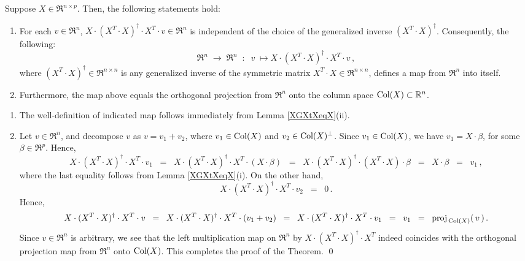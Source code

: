 \begin{theorem}
\mbox{}\vskip 0.1cm\noindent
Suppose $X \in \Re^{n \times p}$.
Then, the following statements hold:
\begin{enumerate}
\item
	For each $v \in \Re^{n}$, $X \cdot (X^{T} \cdot X)^{\dagger} \cdot X^{T} \cdot v \in \Re^{n}$
	is independent of the choice of the generalized inverse $(X^{T} \cdot X)^{\dagger}$.
	Consequently, the following:
	\begin{equation*}
	\Re^{n} \; \longrightarrow \; \Re^{n}
	\;\; : \;\;
	v \; \longmapsto X \cdot (X^{T} \cdot X)^{\dagger} \cdot X^{T} \cdot v\,,
	\end{equation*}
	where $(X^{T} \cdot X)^{\dagger} \in \Re^{n \times n}$
	is any generalized inverse of the symmetric matrix
	$X^{T} \cdot X \in \Re^{n \times n}$, defines a map from $\Re^{n}$ into itself.
\item
	Furthermore, the map above equals the orthogonal projection
	from $\Re^{n}$ onto the column space $\textnormal{Col}(X) \subset \mathbb{R}^{n}$.
\end{enumerate}
\end{theorem}
\proof
\begin{enumerate}
\item
	The well-definition of indicated map follows immediately from Lemma \ref{XGXtXeqX}(ii).
\item
Let $v \in \Re^{n}$, and decompose $v$ as $v = v_{1} + v_{2}$,
where $v_{1} \in \textnormal{Col}(X)$ and $v_{2} \in \textnormal{Col}(X)^{\perp}$.
Since $v_{1} \in \textnormal{Col}(X)$, we have $v_{1} = X\cdot\beta$,
for some $\beta \in \Re^{p}$.
Hence,
\begin{equation*}
X \cdot (X^{T} \cdot X)^{\dagger} \cdot X^{T} \cdot v_{1}
\;\; = \;\;
	X \cdot (X^{T} \cdot X)^{\dagger} \cdot X^{T} \cdot (X \cdot \beta)
\;\; = \;\;
	X \cdot (X^{T} \cdot X)^{\dagger} \cdot (X^{T} \cdot X) \cdot \beta
\;\; = \;\;
	X \cdot \beta
\;\; = \;\;
	v_{1}\,,
\end{equation*}
where the last equality follows from Lemma \ref{XGXtXeqX}(i).
On the other hand,
\begin{equation*}
X \cdot (X^{T} \cdot X)^{\dagger} \cdot X^{T} \cdot v_{2}
\;\; = \;\;
	0\,.
\end{equation*}
Hence,
\begin{equation*}
X \cdot (X^{T} \cdot X)^{\dagger} \cdot X^{T} \cdot v
\;\; = \;\;
	X \cdot (X^{T} \cdot X)^{\dagger} \cdot X^{T} \cdot (v_{1} + v_{2})
\;\; = \;\;
	X \cdot (X^{T} \cdot X)^{\dagger} \cdot X^{T} \cdot v_{1}
\;\; = \;\;
	v_{1}
\;\; = \;\;
	\textnormal{proj}_{\,\textnormal{Col}(X)}(\,v\,)\,.
\end{equation*}
Since $v \in \Re^{n}$ is arbitrary, we see that the left multiplication map on $\Re^{n}$
by $X \cdot (X^{T} \cdot X)^{\dagger} \cdot X^{T}$ indeed coincides with the
orthogonal projection map from $\Re^{n}$ onto $\textnormal{Col}(X)$.
This completes the proof of the Theorem.
\qed
\end{enumerate}

